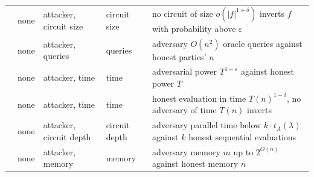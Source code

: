 \begin{table}[t]
\begin{tabular}{@{}lllp{2.2cm}p{7.4cm}@{}}
\cite{BC22} & none & attacker, circuit size & circuit size & no circuit of size $o(|f|^{1+\delta})$ inverts $f$ with probability above $\varepsilon$ \\
\cite{BM09} & none & attacker, queries & queries & adversary $O(n^2)$ oracle queries against honest parties' $n$ \\
\cite{BGHKP24} & none & attacker, time & time & adversarial power $T^{1-\varepsilon}$ against honest power $T$ \\
\cite{LLW19} & none & attacker, time & time & honest evaluation in time $T(n)^{1-\delta}$, no adversary of time $T(n)$ inverts \\
\cite{GM24} & none & attacker, circuit depth & circuit depth & adversary parallel time below $k \cdot t_A(\lambda)$ against $k$ honest sequential evaluations \\
\cite{DQW23} & none & attacker, memory & memory & adversary memory $m$ up to $2^{O(n)}$ against honest memory $n$ \\
\bottomrule
\end{tabular}
\end{table}
